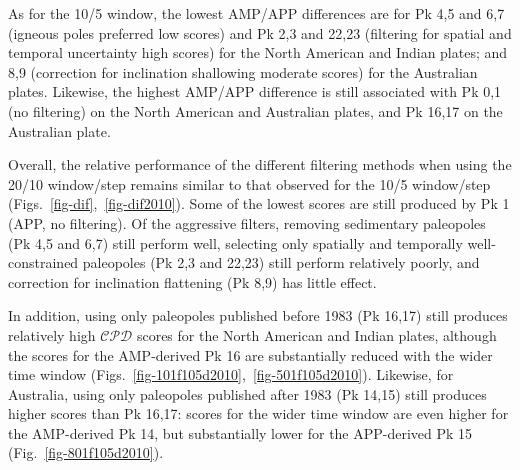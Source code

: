 As for the 10/5 window, the lowest AMP/APP differences are for Pk 4,5 and 6,7
(igneous poles preferred \textendash{} low scores) and Pk 2,3 and 22,23
(filtering for spatial and temporal uncertainty \textendash{} high scores) for
the North American and Indian plates; and 8,9 (correction for inclination
shallowing \textendash{} moderate scores) for the Australian plates. Likewise,
the highest AMP/APP difference is still associated with Pk 0,1 (no filtering) on
the North American and Australian plates, and Pk 16,17 on the Australian plate.

Overall, the relative performance of the different filtering methods when using
the 20/10 window/step remains similar to that observed for the 10/5 window/step
(Figs.~\ref{fig-dif},~\ref{fig-dif2010}). Some of the lowest scores are still
produced by Pk 1 (APP, no filtering). Of the aggressive filters, removing
sedimentary paleopoles (Pk 4,5 and 6,7) still perform well, selecting only
spatially and temporally well-constrained paleopoles (Pk 2,3 and 22,23) still
perform relatively poorly, and correction for inclination flattening (Pk 8,9)
has little effect.

In addition, using only paleopoles published before 1983 (Pk 16,17) still
produces relatively high $\mathcal{CPD}$ scores for the North American and
Indian plates, although the scores for the AMP-derived Pk 16 are substantially
reduced with the wider time window (Figs.~\ref{fig-101f105d2010},~\ref{fig-501f105d2010}).
Likewise, for Australia, using only paleopoles published after 1983 (Pk 14,15)
still produces higher scores than Pk 16,17: scores for the wider time window are
even higher for the AMP-derived Pk 14, but substantially lower for the
APP-derived Pk 15 (Fig.~\ref{fig-801f105d2010}).

